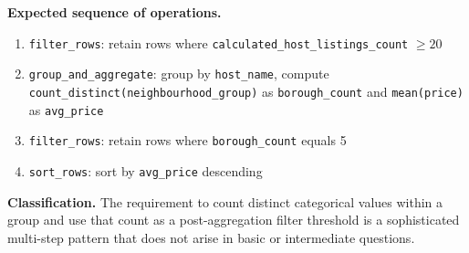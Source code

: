 \textbf{Expected sequence of operations.}
\begin{enumerate}
  \item \texttt{filter\_rows}: retain rows where
    \texttt{calculated\_host\_listings\_count} $\geq 20$
  \item \texttt{group\_and\_aggregate}: group by \texttt{host\_name}, compute
    \texttt{count\_distinct(neighbourhood\_group)} as
    \texttt{borough\_count} and \texttt{mean(price)} as
    \texttt{avg\_price}
  \item \texttt{filter\_rows}: retain rows where \texttt{borough\_count}
    equals 5
  \item \texttt{sort\_rows}: sort by \texttt{avg\_price} descending
\end{enumerate}

\textbf{Classification.}
The requirement to count distinct categorical values within a group and use that count as a post-aggregation filter threshold is a sophisticated multi-step pattern that does not arise in basic or intermediate questions.